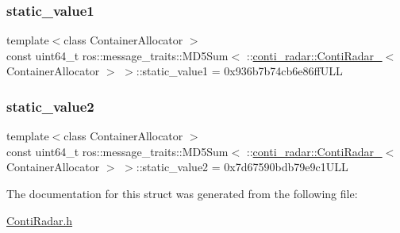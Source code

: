 \subsubsection{\texorpdfstring{static\+\_\+value1}{static\_value1}}
{\footnotesize\ttfamily template$<$class Container\+Allocator $>$ \\
const uint64\+\_\+t ros\+::message\+\_\+traits\+::\+M\+D5\+Sum$<$ \+::\hyperlink{structconti__radar_1_1ContiRadar__}{conti\+\_\+radar\+::\+Conti\+Radar\+\_\+}$<$ Container\+Allocator $>$ $>$\+::static\+\_\+value1 = 0x936b7b74cb6e86ff\+U\+LL\hspace{0.3cm}{\ttfamily [static]}}

\mbox{\label{structros_1_1message__traits_1_1MD5Sum_3_01_1_1conti__radar_1_1ContiRadar___3_01ContainerAllocator_01_4_01_4_a8b73e8c00865826204d1530177125472}} 
\subsubsection{\texorpdfstring{static\+\_\+value2}{static\_value2}}
{\footnotesize\ttfamily template$<$class Container\+Allocator $>$ \\
const uint64\+\_\+t ros\+::message\+\_\+traits\+::\+M\+D5\+Sum$<$ \+::\hyperlink{structconti__radar_1_1ContiRadar__}{conti\+\_\+radar\+::\+Conti\+Radar\+\_\+}$<$ Container\+Allocator $>$ $>$\+::static\+\_\+value2 = 0x7d67590bdb79e9c1\+U\+LL\hspace{0.3cm}{\ttfamily [static]}}



The documentation for this struct was generated from the following file\+:\begin{DoxyCompactItemize}
\item 
\hyperlink{ContiRadar_8h}{Conti\+Radar.\+h}\end{DoxyCompactItemize}
